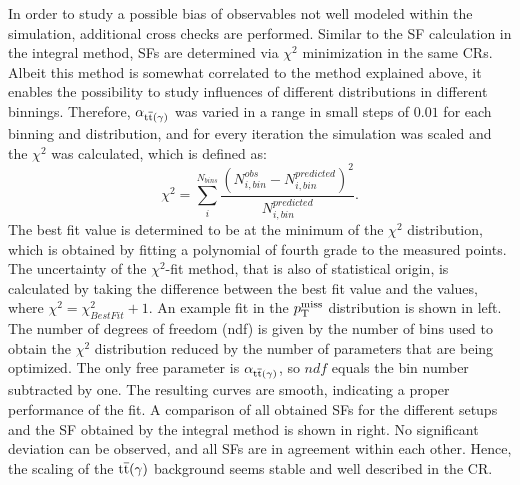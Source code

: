 In order to study a possible bias of observables not well modeled within the simulation, additional cross checks are performed. Similar to the SF calculation in the integral method, SFs are determined via $\chi^2$ minimization in the same CRs. Albeit this method is somewhat correlated to the method explained above, it enables the possibility to study influences of different distributions in different binnings. Therefore, $\alpha_{{\mathrm{t}\overline{\mathrm{t}}}(\gamma)}$ was varied in a range in small steps of $0.01$ for each binning and distribution, and for every iteration the simulation was scaled and the $\chi^2$ was calculated, which is defined as:
\begin{equation}
 \chi^2=\sum_i^{N_{bins}} \frac{\left(N_{i,bin}^{obs}-N_{i,bin}^{predicted}\right)^2}{N_{i,bin}^{predicted}}.
\end{equation}
The best fit value is determined to be at the minimum of the $\chi^2$ distribution, which is obtained by fitting a polynomial of fourth grade to the measured points. The uncertainty of the $\chi^2$-fit method, that is also of statistical origin, is calculated by taking the difference between the best fit value and the values, where $\chi^2=\chi^2_{BestFit}+1$. An example fit in the $p_{\mathrm{T}}^\text{miss}$ distribution is shown in  left. The number of degrees of freedom (ndf) is given by the number of bins used to obtain the $\chi^2$ distribution reduced by the number of parameters that are being optimized. The only free parameter is $\alpha_{{\mathrm{t}\overline{\mathrm{t}}}(\gamma)}$, so $ndf$ equals the bin number subtracted by one. The resulting curves are smooth, indicating a proper performance of the fit. A comparison of all obtained SFs for the different setups and the SF obtained by the integral method is shown in  right. No significant deviation can be observed, and all SFs are in agreement within each other. Hence, the scaling of the ${\mathrm{t}\overline{\mathrm{t}}}(\gamma)$ background seems stable and well described in the CR.
